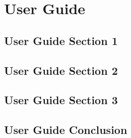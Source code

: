 %
\chapter{User Guide}
\label{sec:userguide}


\Blindtext[2][1]

\section{User Guide Section 1}
\label{sec:userguide:sec1}

\Blindtext[2][2]

\section{User Guide Section 2}
\label{sec:userguide:sec2}

\Blindtext[3][2]

\section{User Guide Section 3}
\label{sec:userguide:sec3}

\Blindtext[4][2]

\section{User Guide Conclusion}
\label{sec:userguide:conclusion}

\Blindtext[2][1]
